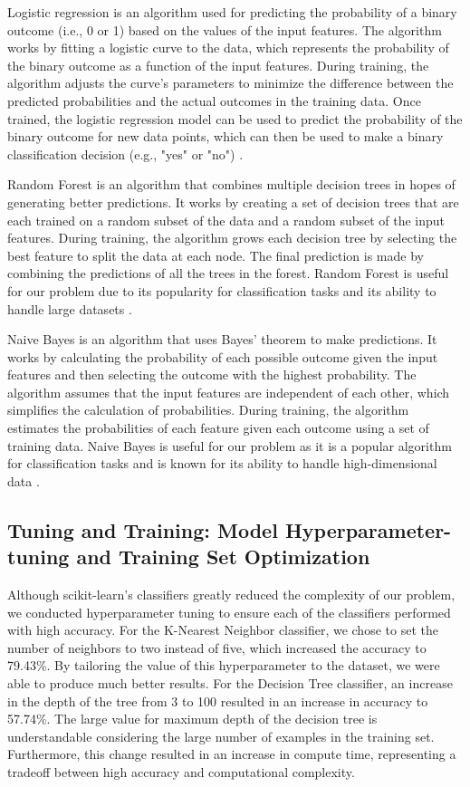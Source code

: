 \documentclass{article}
\begin{document}
Logistic regression is an algorithm used for predicting the probability of a binary outcome (i.e., 0 or 1) based on the values of the input features. The algorithm works by fitting a logistic curve to the data, which represents the probability of the binary outcome as a function of the input features. During training, the algorithm adjusts the curve's parameters to minimize the difference between the predicted probabilities and the actual outcomes in the training data. Once trained, the logistic regression model can be used to predict the probability of the binary outcome for new data points, which can then be used to make a binary classification decision (e.g., "yes" or "no") \cite{logisticregression23, supervisedlearning}.

Random Forest is an algorithm that combines multiple decision trees in hopes of generating better predictions. It works by creating a set of decision trees that are each trained on a random subset of the data and a random subset of the input features. During training, the algorithm grows each decision tree by selecting the best feature to split the data at each node. The final prediction is made by combining the predictions of all the trees in the forest. Random Forest is useful for our problem due to its popularity for classification tasks and its ability to handle large datasets \cite{randomforest23, supervisedlearning}.

Naive Bayes is an algorithm that uses Bayes' theorem to make predictions. It works by calculating the probability of each possible outcome given the input features and then selecting the outcome with the highest probability. The algorithm assumes that the input features are independent of each other, which simplifies the calculation of probabilities. During training, the algorithm estimates the probabilities of each feature given each outcome using a set of training data. Naive Bayes is useful for our problem as it is a popular algorithm for classification tasks and is known for its ability to handle high-dimensional data \cite{naivebayes23, supervisedlearning}.

\subsection{Tuning and Training: Model Hyperparameter-tuning and Training Set Optimization}

Although scikit-learn’s classifiers greatly reduced the complexity of our problem, we conducted hyperparameter tuning to ensure each of the classifiers performed with high accuracy. For the K-Nearest Neighbor classifier, we chose to set the number of neighbors to two instead of five, which increased the accuracy to 79.43\%. By tailoring the value of this hyperparameter to the dataset, we were able to produce much better results. For the Decision Tree classifier, an increase in the depth of the tree from 3 to 100 resulted in an increase in accuracy to 57.74\%. The large value for maximum depth of the decision tree is understandable considering the large number of examples in the training set. Furthermore, this change resulted in an increase in compute time, representing a tradeoff between high accuracy and computational complexity.
\end{document}
